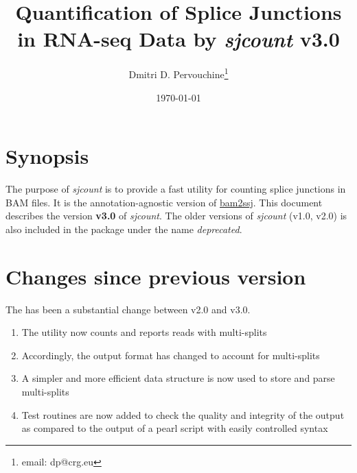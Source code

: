 \documentclass{article}
\begin{document}
\title{Quantification of Splice Junctions in RNA-seq Data by {\em sjcount} v3.0}

\author{Dmitri D. Pervouchine\thanks{email: dp@crg.eu}}

\date{\today}
\maketitle
\tableofcontents

\section{Synopsis}

The purpose of {\em sjcount} is to provide a fast utility for counting splice junctions in BAM files. 
It is the annotation-agnostic version of \href{https://github.com/pervouchine/bam2ssj}{bam2ssj}. 
This document describes the version {\bf v3.0} of {\em sjcount}. The older versions of {\em sjcount}
(v1.0, v2.0) is also included in the package under the name {\em deprecated}.

\section{Changes since previous version}
The has been a substantial change between v2.0 and v3.0.
\begin{enumerate}
\item The utility now counts and reports reads with multi-splits
\item Accordingly, the output format has changed to account for multi-splits
\item A simpler and more efficient data structure is now used to store and parse multi-splits
\item Test routines are now added to check the quality and integrity of the output as compared to the output of 
a pearl script with easily controlled syntax
\end{enumerate}
\end{document}
